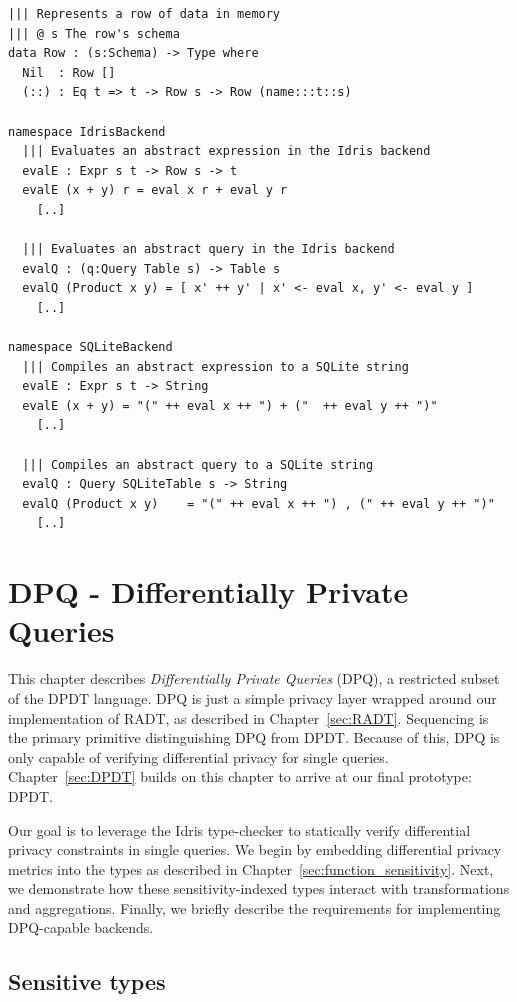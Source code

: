 \documentclass[12pt]{report}
\begin{document}
\begin{lstlisting}[caption={Implementing backends (snippets)},label={lst:idris_backend}]
||| Represents a row of data in memory
||| @ s The row's schema
data Row : (s:Schema) -> Type where
  Nil  : Row []
  (::) : Eq t => t -> Row s -> Row (name:::t::s)

namespace IdrisBackend
  ||| Evaluates an abstract expression in the Idris backend
  evalE : Expr s t -> Row s -> t
  evalE (x + y) r = eval x r + eval y r
    [..]

  ||| Evaluates an abstract query in the Idris backend
  evalQ : (q:Query Table s) -> Table s
  evalQ (Product x y) = [ x' ++ y' | x' <- eval x, y' <- eval y ]
    [..]

namespace SQLiteBackend
  ||| Compiles an abstract expression to a SQLite string
  evalE : Expr s t -> String
  evalE (x + y) = "(" ++ eval x ++ ") + ("  ++ eval y ++ ")"
    [..]

  ||| Compiles an abstract query to a SQLite string
  evalQ : Query SQLiteTable s -> String
  evalQ (Product x y)    = "(" ++ eval x ++ ") , (" ++ eval y ++ ")"
    [..]
\end{lstlisting}

\chapter{DPQ - Differentially Private Queries}\label{sec:DPQ}

This chapter describes \textit{Differentially Private Queries} (DPQ), a restricted subset of the DPDT language.
DPQ is just a simple privacy layer wrapped around our implementation of RADT, as described in Chapter~\ref{sec:RADT}.
Sequencing is the primary primitive distinguishing DPQ from DPDT.
Because of this, DPQ is only capable of verifying differential privacy for single queries.
Chapter~\ref{sec:DPDT} builds on this chapter to arrive at our final prototype: DPDT.

Our goal is to leverage the Idris type-checker to statically verify differential privacy constraints in single queries.
We begin by embedding differential privacy metrics into the types as described in Chapter~\ref{sec:function_sensitivity}.
Next, we demonstrate how these sensitivity-indexed types interact with transformations and aggregations.
Finally, we briefly describe the requirements for implementing DPQ-capable backends.

\section{Sensitive types}
\end{document}

